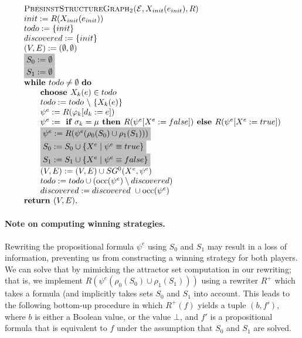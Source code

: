 \documentclass{article}
\newcommand{\Return}{\text{\textbf{return }}}
\begin{document}
\begin{equation*}
\begin{array}{l}
\textsc{PbesinstStructureGraph$_2$(}\mathcal{E}, X_{init}(e_{init}), R) \\ 
init:=R(X_{init}(e_{init})) \\
todo:=\{init\} \\
discovered:=\{init\} \\
(V,E) :=(\emptyset ,\emptyset ) \\ 
\colorbox{lightgray}{$%
S_0:= \emptyset $}\\
\colorbox{lightgray}{$%
S_1:= \emptyset $}\\
\text{\textbf{while }}todo\neq \emptyset \text{ \textbf{do}} \\ 
\qquad \text{\textbf{choose }}X_{k}(e)\in todo \\ 
\qquad todo:=todo\ \backslash \ \{X_{k}(e)\} \\ 
\qquad \psi ^{e}:=R(\varphi _{k}[d_{k}:=e]) \\ 
\qquad \psi^e := \textbf{ if } \sigma_k = \mu \textbf{ then } R(\psi^e[X^e := false])
\textbf{ else }  R(\psi^e[X^e := true]) \\
\qquad \colorbox{lightgray}{$%
\psi^{e} := R(\psi^e (\rho_0(S_0) \cup \rho_1(S_1) ) ) $}\\
\qquad \colorbox{lightgray}{$%
S_0 := S_0 \cup \{ X^e \mid \psi^e \equiv true \} $}\\
\qquad \colorbox{lightgray}{$%
S_1 := S_1 \cup \{ X^e \mid \psi^e \equiv false \} $}\\
\qquad (V,E) := (V,E) \cup SG^{0}(X^{e},\psi ^{e}) \\ 
\qquad todo:=todo\cup (\mathrm{occ}(\psi ^{e})\setminus discovered) \\
\qquad discovered:=discovered\ \cup \mathrm{occ}(\psi ^{e}) \\
\Return (V, E),%
\end{array}%
\end{equation*}%

\paragraph{Note on computing winning strategies.} Rewriting the propositional formula
$\psi^e$ using $S_0$ and $S_1$ may result in a loss of information, preventing us from
constructing a winning strategy for both players. We can solve that by mimicking the
attractor set computation in our rewriting; that is, we implement $R(\psi^e(\rho_0(S_0) \cup \rho_1(S_1)))$
using a rewriter $R^+$ which takes a formula (and implicitly takes sets $S_0$ and $S_1$ into account. 
This leads to the following bottom-up
procedure in which $R^+(f)$ yields a tuple $(b, f')$, where $b$ is either a Boolean value,
or the value $\bot$, and $f'$ is a propositional formula that is equivalent to $f$ under
the assumption that $S_0$ and $S_1$ are solved.
\end{document}

